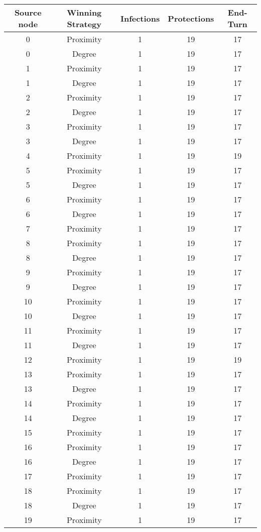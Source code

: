 \documentclass[results.tex]{subfiles}
\begin{document}
\begin{center}
  \begin{tabular}{| c || c | c | c | c |}
    \hline
    {\bfseries Source node} & {\bfseries Winning Strategy} & {\bfseries Infections} & {\bfseries Protections} & {\bfseries End-Turn} \\  %
    \hline\hline
    0 & Proximity & 1 & 19 & 17 \\
    \hline
    0 & Degree & 1 & 19 & 17 \\
    \hline
    1 & Proximity & 1 & 19 & 17 \\
    \hline
    1 & Degree & 1 & 19 & 17 \\
    \hline
    2 & Proximity & 1 & 19 & 17 \\
    \hline
    2 & Degree & 1 & 19 & 17 \\
    \hline
    3 & Proximity & 1 & 19 & 17 \\
    \hline
    3 & Degree & 1 & 19 & 17 \\
    \hline
    4 & Proximity & 1 & 19 & 19 \\
    \hline
    5 & Proximity & 1 & 19 & 17 \\
    \hline
    5 & Degree & 1 & 19 & 17 \\
    \hline
    6 & Proximity & 1 & 19 & 17 \\
    \hline
    6 & Degree & 1 & 19 & 17 \\
    \hline
    7 & Proximity & 1 & 19 & 17 \\
    \hline
    8 & Proximity & 1 & 19 & 17 \\
    \hline
    8 & Degree & 1 & 19 & 17 \\
    \hline
    9 & Proximity & 1 & 19 & 17 \\
    \hline
    9 & Degree & 1 & 19 & 17 \\
    \hline
    10 & Proximity & 1 & 19 & 17 \\
    \hline
    10 & Degree & 1 & 19 & 17 \\
    \hline
    11 & Proximity & 1 & 19 & 17 \\
    \hline
    11 & Degree & 1 & 19 & 17\\
    \hline
    12 & Proximity & 1 & 19 & 19 \\
    \hline
    13 & Proximity & 1 & 19 & 17 \\
    \hline
    13 & Degree & 1 & 19 & 17 \\ 
    \hline
    14 & Proximity & 1 & 19 & 17 \\
    \hline
    14 & Degree & 1 & 19 & 17 \\
    \hline
    15 & Proximity & 1 & 19 & 17 \\
    \hline
    16 & Proximity & 1 & 19 & 17 \\
    \hline
    16 & Degree & 1 & 19 & 17 \\
    \hline
    17 & Proximity & 1 & 19 & 17 \\
    \hline
    18 & Proximity & 1 & 19 & 17 \\
    \hline
    18 & Degree & 1 & 19 & 17 \\
    \hline
    19 & Proximity & 1 & 19 & 17 \\
    \hline
  \end{tabular}
\end{center}
\end{document}
